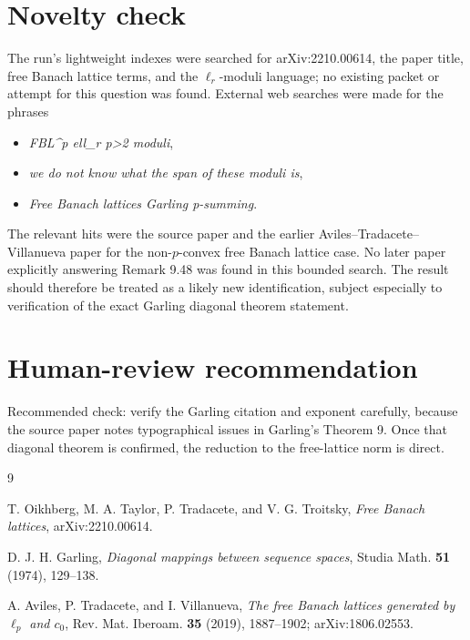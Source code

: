 \documentclass[11pt]{article}
\begin{document}
\section*{Novelty check}

The run's lightweight indexes were searched for arXiv:2210.00614, the paper
title, free Banach lattice terms, and the \(\ell_r\)-moduli language; no
existing packet or attempt for this question was found.  External web
searches were made for the phrases
\begin{itemize}
\item \emph{FBL\^{}p ell\_r p>2 moduli},
\item \emph{we do not know what the span of these moduli is},
\item \emph{Free Banach lattices Garling p-summing}.
\end{itemize}
The relevant hits were the source paper and the earlier
Aviles--Tradacete--Villanueva paper for the non-\(p\)-convex free Banach
lattice case.  No later paper explicitly answering Remark 9.48 was found in
this bounded search.  The result should therefore be treated as a likely new
identification, subject especially to verification of the exact Garling
diagonal theorem statement.

\section*{Human-review recommendation}

Recommended check: verify the Garling citation and exponent carefully,
because the source paper notes typographical issues in Garling's Theorem 9.
Once that diagonal theorem is confirmed, the reduction to the free-lattice
norm is direct.

\begin{thebibliography}{9}

T. Oikhberg, M. A. Taylor, P. Tradacete, and V. G. Troitsky,
\emph{Free Banach lattices}, arXiv:2210.00614.

D. J. H. Garling,
\emph{Diagonal mappings between sequence spaces},
Studia Math. \textbf{51} (1974), 129--138.

A. Aviles, P. Tradacete, and I. Villanueva,
\emph{The free Banach lattices generated by \(\ell_p\) and \(c_0\)},
Rev. Mat. Iberoam. \textbf{35} (2019), 1887--1902; arXiv:1806.02553.

\end{thebibliography}
\end{document}
